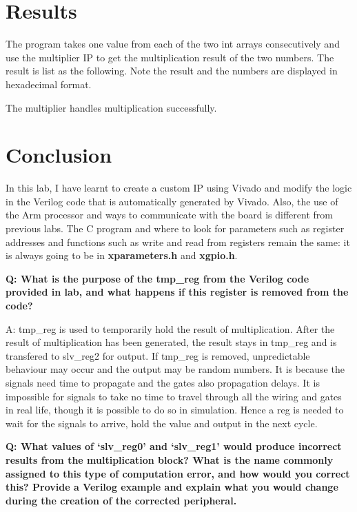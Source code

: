 \documentclass[11pt,letterpaper,titlepage]{article}
\begin{document}
\newpage

\part{Results}

The program takes one value from each of the two int arrays consecutively and use the multiplier IP to get the multiplication result of the two numbers. The result is list as the following. Note the result and the numbers are displayed in hexadecimal format.


The multiplier handles multiplication successfully.

\newpage

\part{Conclusion}

In this lab, I have learnt to create a custom IP using Vivado and modify the logic in the Verilog code that is automatically generated by Vivado. Also, the use of the Arm processor and ways to communicate with the board is different from previous labs. The C program and where to look for parameters such as register addresses and functions such as write and read from registers remain the same: it is always going to be in \textbf{xparameters.h} and \textbf{xgpio.h}.

\textbf{Q: What is the purpose of the tmp\_reg from the Verilog code provided in lab, and what happens if
this register is removed from the code?}

A: tmp\_reg is used to temporarily hold the result of multiplication. After the result of multiplication has been generated, the result stays in tmp\_reg  and is transfered to slv\_reg2 for output. If tmp\_reg is removed, unpredictable behaviour may occur and the output may be random numbers. It is because the signals need time to propagate and the gates also propagation delays. It is impossible for signals to take no time to travel through all the wiring and gates in real life, though it is possible to do so in simulation. Hence a reg is needed to wait for the signals to arrive, hold the value and output in the next cycle.

\textbf{Q: What values of ‘slv\_reg0’ and ‘slv\_reg1’ would produce incorrect results from the multiplication
block? What is the name commonly assigned to this type of computation error, and how would
you correct this? Provide a Verilog example and explain what you would change during the
creation of the corrected peripheral.}
\end{document}
